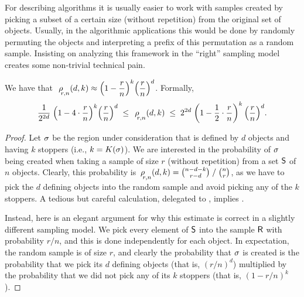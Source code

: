 \bigskip

%
For describing algorithms it is usually easier to work with samples
created by picking a subset of a certain size (without repetition)
from the original set of objects. Usually, in the algorithmic
applications this would be done by randomly permuting the objects and
interpreting a prefix of this permutation as a random
sample. Insisting on analyzing this framework in the ``right''
sampling model creates some non-trivial technical pain.



\begin{lemma}
    We have that $\ds\,\CSProbFull{r}{d}{k}{n} \approx
    \pth{1-\frac{r}{n}}^k \pth{\frac{r}{n}}^d$. Formally,
    \begin{equation}
        \frac{1}{2^{2d}} \;
        \pth{ 1 - 4 \cdot \frac{ r}{n} }^{k}
        \pth{\frac{r}{n}}^d
        \;\leq \;
        \CSProbFull{r}{d}{k}{n}
        \;\leq\; 2^{2d} \;
        \pth{ 1 - \frac{1}{2} \cdot \frac{r}{n} }^{k}
        \,\pth{\frac{r}{n}}^d.
        \eqlab{c:s:probability}
    \end{equation}    
\end{lemma}

\begin{proof}
    Let $\sigma$ be the region under consideration that is defined by
    $d$ objects and having $k$ stoppers (i.e.,
    $k=\KillSet{\Trap}$). We are interested in the probability of
    $\sigma$ being created when taking a sample of size $r$ (without
    repetition) from a set $\mathsf{S}$ of $n$ objects. Clearly, this
    probability is $\CSProbFull{r}{d}{k}{n} = {\binom{n-d-k}{r-d}}
    \;/\; { \binom{n}{r}}$, as we have to pick the $d$ defining
    objects into the random sample and avoid picking any of the $k$
    stoppers. A tedious but careful calculation, delegated to
    , implies .
    
    Instead, here is an elegant argument for why this estimate is
    correct in a slightly different sampling model. We pick every
    element of $\mathsf{S}$ into the sample $\mathsf{R}$ with probability
    $r/n$, and this is done independently for each object. In
    expectation, the random sample is of size $r$, and clearly the
    probability that $\sigma$ is created is the probability that we
    pick its $d$ defining objects (that is, $(r/n)^d$) multiplied by
    the probability that we did not pick any of its $k$ stoppers (that
    is, $(1-r/n)^k$).
\end{proof}

